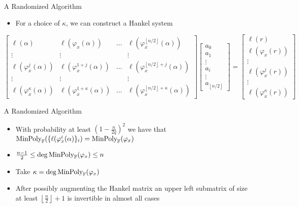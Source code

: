 \documentclass{beamer}
\newcommand{\minpol}{\textnormal{MinPoly}_{\mathbb{F}}}
\begin{document}
    \begin{frame}{A Randomized Algorithm}
    \begin{itemize}
    \item For a choice of $\kappa$, we can construct a Hankel system
\end{itemize}
\[ \begin{bmatrix}\ell(\alpha) & \ell(\varphi_x(\alpha)) & \ldots & \ell(\varphi_x^{\left\lfloor n/2 \right\rfloor}(\alpha)) \\ \vdots & \vdots & & \vdots \\ 

\ell(\varphi_x^{j}(\alpha)) & \ell(\varphi_x^{1+j}(\alpha)) & \ldots & \ell(\varphi_x^{\left\lfloor n/2 \right\rfloor+j}(\alpha)) \\ \vdots & \vdots & & \vdots \\

\ell(\varphi_x^{\kappa}(\alpha)) & \ell(\varphi_x^{1 + \kappa }(\alpha)) & \ldots & \ell(\varphi_x^{\left\lfloor n/2 \right\rfloor + \kappa}(\alpha))

\end{bmatrix} \begin{bmatrix} a_0 \\ a_1 \\ \vdots \\ a_i \\ \vdots \\ a_{\left\lfloor n/2 \right\rfloor} \end{bmatrix} = \begin{bmatrix} \ell(r) \\ \ell(\varphi_x(r)) \\ \vdots \\ \ell(\varphi_x^j(r)) \\ \vdots  \\   \ell(\varphi_x^{\kappa}(r)) \end{bmatrix} \]
    
\end{frame}





\begin{frame}{A Randomized Algorithm}

\begin{itemize}
    \item  With probability at least $(1 - \frac{n}{2q})^2$ we have that $\minpol(\{\ell(\varphi_x^i(\alpha)\}_i) = \minpol(\varphi_x)$
    \item $\frac{n-1}{2} \leq \deg \minpol(\varphi_x) \leq n$
    \item Take $\kappa = \deg \minpol(\varphi_x)$
    \item After possibly augmenting the Hankel matrix an upper left submatrix of size at least $\left\lfloor \frac{n}{2} \right\rfloor + 1$ is invertible in almost all cases
\end{itemize}
    
\end{frame}
\end{document}
